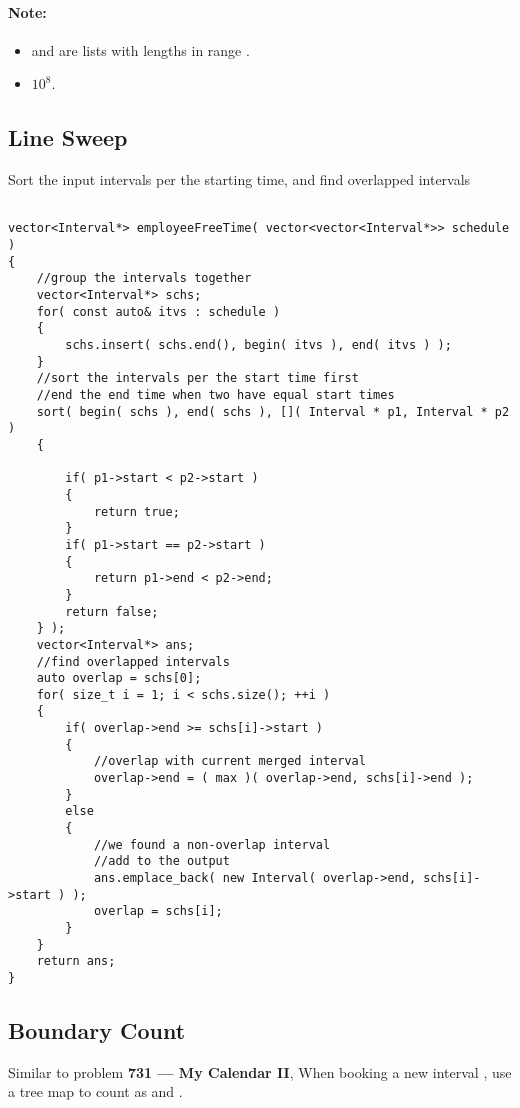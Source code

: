 \paragraph{Note:}

\begin{itemize}
\item {} and  are lists with lengths in range \fcj{[1, 50]}.
\item {} $10^8$.
\end{itemize}

\subsection{Line Sweep}
Sort the input intervals per the starting time, and find overlapped intervals

\setcounter{lstlisting}{0}
\begin{lstlisting}[style=customc, caption={Line Sweep}]

vector<Interval*> employeeFreeTime( vector<vector<Interval*>> schedule )
{
    //group the intervals together
    vector<Interval*> schs;
    for( const auto& itvs : schedule )
    {
        schs.insert( schs.end(), begin( itvs ), end( itvs ) );
    }
    //sort the intervals per the start time first
    //end the end time when two have equal start times
    sort( begin( schs ), end( schs ), []( Interval * p1, Interval * p2 )
    {

        if( p1->start < p2->start )
        {
            return true;
        }
        if( p1->start == p2->start )
        {
            return p1->end < p2->end;
        }
        return false;
    } );
    vector<Interval*> ans;
    //find overlapped intervals
    auto overlap = schs[0];
    for( size_t i = 1; i < schs.size(); ++i )
    {
        if( overlap->end >= schs[i]->start )
        {
            //overlap with current merged interval
            overlap->end = ( max )( overlap->end, schs[i]->end );
        }
        else
        {
            //we found a non-overlap interval
            //add to the output
            ans.emplace_back( new Interval( overlap->end, schs[i]->start ) );
            overlap = schs[i];
        }
    }
    return ans;
}
\end{lstlisting}

\subsection{Boundary Count}
Similar to problem \textbf{731 --- My Calendar II}, When booking a new interval , use a tree map  to count as   and .

